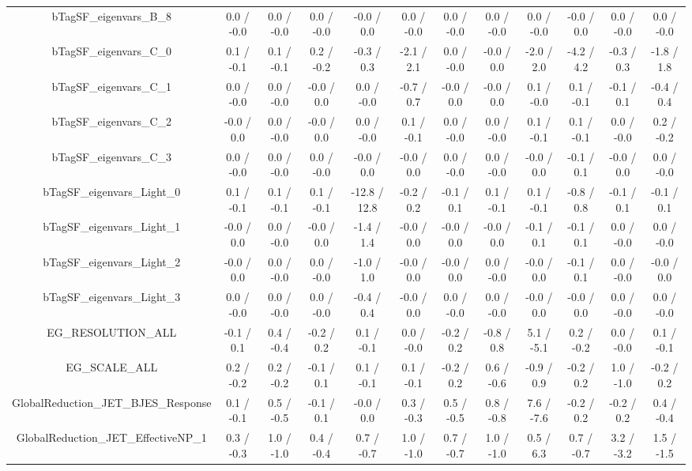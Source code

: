 \begin{table}[htbp]
\begin{center}
\begin{tabular}{|c|c|c|c|c|c|c|c|c|c|c|c|}
  bTagSF_eigenvars_B_8 & 0.0 / -0.0 & 0.0 / -0.0 & 0.0 / -0.0 & -0.0 / 0.0 & 0.0 / -0.0 & 0.0 / -0.0 & 0.0 / -0.0 & 0.0 / -0.0 & -0.0 / 0.0 & 0.0 / -0.0 & 0.0 / -0.0 \\ 
  bTagSF_eigenvars_C_0 & 0.1 / -0.1 & 0.1 / -0.1 & 0.2 / -0.2 & -0.3 / 0.3 & -2.1 / 2.1 & 0.0 / -0.0 & -0.0 / 0.0 & -2.0 / 2.0 & -4.2 / 4.2 & -0.3 / 0.3 & -1.8 / 1.8 \\ 
  bTagSF_eigenvars_C_1 & 0.0 / -0.0 & 0.0 / -0.0 & -0.0 / 0.0 & 0.0 / -0.0 & -0.7 / 0.7 & -0.0 / 0.0 & -0.0 / 0.0 & 0.1 / -0.0 & 0.1 / -0.1 & -0.1 / 0.1 & -0.4 / 0.4 \\ 
  bTagSF_eigenvars_C_2 & -0.0 / 0.0 & 0.0 / -0.0 & -0.0 / 0.0 & 0.0 / -0.0 & 0.1 / -0.1 & 0.0 / -0.0 & 0.0 / -0.0 & 0.1 / -0.1 & 0.1 / -0.1 & 0.0 / -0.0 & 0.2 / -0.2 \\ 
  bTagSF_eigenvars_C_3 & 0.0 / -0.0 & 0.0 / -0.0 & 0.0 / -0.0 & -0.0 / 0.0 & -0.0 / 0.0 & 0.0 / -0.0 & 0.0 / -0.0 & -0.0 / 0.0 & -0.1 / 0.1 & -0.0 / 0.0 & 0.0 / -0.0 \\ 
  bTagSF_eigenvars_Light_0 & 0.1 / -0.1 & 0.1 / -0.1 & 0.1 / -0.1 & -12.8 / 12.8 & -0.2 / 0.2 & -0.1 / 0.1 & 0.1 / -0.1 & 0.1 / -0.1 & -0.8 / 0.8 & -0.1 / 0.1 & -0.1 / 0.1 \\ 
  bTagSF_eigenvars_Light_1 & -0.0 / 0.0 & 0.0 / -0.0 & -0.0 / 0.0 & -1.4 / 1.4 & -0.0 / 0.0 & -0.0 / 0.0 & -0.0 / 0.0 & -0.1 / 0.1 & -0.1 / 0.1 & 0.0 / -0.0 & 0.0 / -0.0 \\ 
  bTagSF_eigenvars_Light_2 & -0.0 / 0.0 & 0.0 / -0.0 & 0.0 / -0.0 & -1.0 / 1.0 & -0.0 / 0.0 & -0.0 / 0.0 & 0.0 / -0.0 & -0.0 / 0.0 & -0.1 / 0.1 & 0.0 / -0.0 & -0.0 / 0.0 \\ 
  bTagSF_eigenvars_Light_3 & 0.0 / -0.0 & 0.0 / -0.0 & 0.0 / -0.0 & -0.4 / 0.4 & -0.0 / 0.0 & 0.0 / -0.0 & 0.0 / -0.0 & -0.0 / 0.0 & -0.0 / 0.0 & 0.0 / -0.0 & 0.0 / -0.0 \\ 
  EG_RESOLUTION_ALL & -0.1 / 0.1 & 0.4 / -0.4 & -0.2 / 0.2 & 0.1 / -0.1 & 0.0 / -0.0 & -0.2 / 0.2 & -0.8 / 0.8 & 5.1 / -5.1 & 0.2 / -0.2 & 0.0 / -0.0 & 0.1 / -0.1 \\ 
  EG_SCALE_ALL & 0.2 / -0.2 & 0.2 / -0.2 & -0.1 / 0.1 & 0.1 / -0.1 & 0.1 / -0.1 & -0.2 / 0.2 & 0.6 / -0.6 & -0.9 / 0.9 & -0.2 / 0.2 & 1.0 / -1.0 & -0.2 / 0.2 \\ 
  GlobalReduction_JET_BJES_Response & 0.1 / -0.1 & 0.5 / -0.5 & -0.1 / 0.1 & -0.0 / 0.0 & 0.3 / -0.3 & 0.5 / -0.5 & 0.8 / -0.8 & 7.6 / -7.6 & -0.2 / 0.2 & -0.2 / 0.2 & 0.4 / -0.4 \\ 
  GlobalReduction_JET_EffectiveNP_1 & 0.3 / -0.3 & 1.0 / -1.0 & 0.4 / -0.4 & 0.7 / -0.7 & 1.0 / -1.0 & 0.7 / -0.7 & 1.0 / -1.0 & 0.5 / 6.3 & 0.7 / -0.7 & 3.2 / -3.2 & 1.5 / -1.5 \\ 

\end{tabular}
\end{center}
\end{table}
